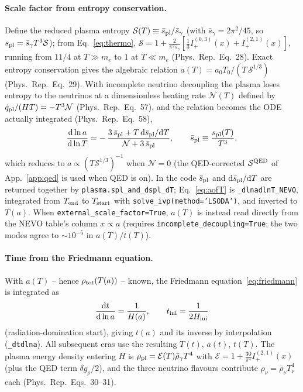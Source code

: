 \documentclass[11pt,a4paper]{article}
\newcommand{\dd}{\mathrm{d}}
\newcommand{\code}[1]{\texttt{#1}}
\newcommand{\PR}{Phys.\ Rep.}
\begin{document}
\paragraph{Scale factor from entropy conservation.}
Define the reduced plasma entropy $\mathcal{S}(T)\equiv\bar s_{\rm pl}/\bar
s_\gamma$ (with $\bar s_\gamma=2\pi^2/45$, so $s_{\rm pl}=\bar s_\gamma T^3
\mathcal{S}$); from Eq.~\eqref{eq:thermo}, $\mathcal{S}=1+\frac{2}{\pi^2\bar
s_\gamma}[\tfrac13 I^{(0,3)}_+(x)+I^{(2,1)}_+(x)]$, running from $11/4$ at $T\gg
m_e$ to $1$ at $T\ll m_e$ (\PR\ Eq.~28). Exact entropy conservation gives the
algebraic relation $a(T)=a_0T_0/(T\,\mathcal{S}^{1/3})$ (\PR\ Eq.~29). With
incomplete neutrino decoupling the plasma loses entropy to the neutrinos at a
dimensionless heating rate $\mathcal{N}(T)$ defined by $\dot q_{\rm pl}/(HT)=
-T^3\mathcal{N}$ (\PR\ Eq.~57), and the relation becomes the ODE actually
integrated (\PR\ Eq.~58),
\begin{equation}
  \frac{\dd\ln a}{\dd\ln T}
  = -\,\frac{3\,\bar s_{\rm pl}+T\,\dd\bar s_{\rm pl}/\dd T}
            {\mathcal{N}+3\,\bar s_{\rm pl}},
  \qquad \bar s_{\rm pl}\equiv \frac{s_{\rm pl}(T)}{T^3},
\label{eq:aofT}
\end{equation}
which reduces to $a\propto(T\mathcal{S}^{1/3})^{-1}$ when $\mathcal{N}=0$ (the
QED-corrected $\mathcal{S}^{\rm QED}$ of App.~\ref{app:qed} is used when QED is
on). In the code $\bar s_{\rm pl}$ and $\dd\bar s_{\rm pl}/\dd T$ are returned
together by \code{plasma.spl\_and\_dspl\_dT}; Eq.~\eqref{eq:aofT} is
\code{\_dlnadlnT\_NEVO}, integrated from $T_{\rm end}$ to $T_{\rm start}$ with
\code{solve\_ivp(method='LSODA')}, and inverted to $T(a)$. When
\code{external\_scale\_factor=True}, $a(T)$ is instead read directly from the
NEVO table's column $x\propto a$ (requires \code{incomplete\_decoupling=True};
the two modes agree to $\sim10^{-5}$ in $a(T)/t(T)$).

\paragraph{Time from the Friedmann equation.}
With $a(T)$ -- hence $\rho_{\rm tot}(T(a))$ -- known, the Friedmann
equation~\eqref{eq:friedmann} is integrated as
\begin{equation}
  \frac{\dd t}{\dd\ln a}=\frac{1}{H(a)},
  \qquad t_{\rm ini}=\frac{1}{2H_{\rm ini}}
\end{equation}
(radiation-domination start), giving $t(a)$ and its inverse by interpolation
(\code{\_dtdlna}). All subsequent eras use the resulting $T(t)$, $a(t)$,
$t(T)$. The plasma energy density entering $H$ is
$\rho_{\rm pl}=\mathcal{E}(T)\bar\rho_\gamma T^4$ with
$\mathcal{E}=1+\tfrac{30}{\pi^4}I^{(2,1)}_+(x)$ (plus the QED term
$\delta g_\rho/2$), and the three neutrino flavours contribute
$\rho_\nu=\bar\rho_\nu T_\nu^4$ each (\PR\ Eqs.~30--31).
\end{document}
